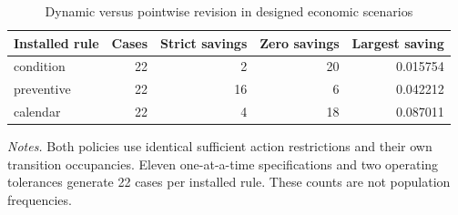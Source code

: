 \begin{table}[t]\centering\small\caption{Dynamic versus pointwise revision in designed economic scenarios}\label{tab:sensitivity_summary}
\begin{tabular}{lrrrr}
\toprule
Installed rule & Cases & Strict savings & Zero savings & Largest saving \\
\midrule
condition & 22 & 2 & 20 & 0.015754 \\
preventive & 22 & 16 & 6 & 0.042212 \\
calendar & 22 & 4 & 18 & 0.087011 \\
\bottomrule\end{tabular}
\par\smallskip\begin{minipage}{\linewidth}\footnotesize\emph{Notes.} Both policies use identical sufficient action restrictions and their own transition occupancies. Eleven one-at-a-time specifications and two operating tolerances generate 22 cases per installed rule. These counts are not population frequencies.\end{minipage}
\end{table}

